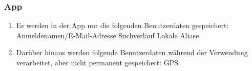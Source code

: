 \subsubsection{App}

\begin{enumerate}
    \item Es werden in der App nur die folgenden Benutzerdaten gespeichert:
        \subitem Anmeldenamen/E-Mail-Adresse
        \subitem Suchverlauf
        \subitem Lokale Aliase
        
    \item Darüber hinaus werden folgende Benutzerdaten während der Verwendung verarbeitet, aber nicht permanent gespeichert:
        \subitem GPS
\end{enumerate}